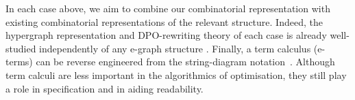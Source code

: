 
In each case above,  we aim to combine our combinatorial representation with existing combinatorial representations of the relevant structure.  Indeed,  the hypergraph representation and DPO-rewriting theory of each case is already well-studied independently of any e-graph structure \cite{ghica_rewriting_2023,alvarez-picallo-functorial_2021}. %
Finally,  a term calculus (e-terms) can be reverse engineered from the string-diagram notation~\cite{ghica_structural_nominal, Heijltjes:FMCII}. Although term calculi are less important in the algorithmics of optimisation, they still play a role in specification and in aiding readability.  